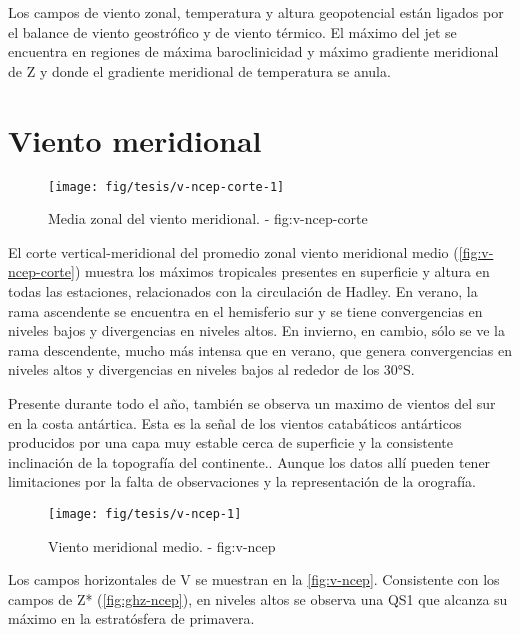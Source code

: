 \documentclass[spanish,a4paper,12p]{book}
\begin{document}
Los campos de viento zonal, temperatura y altura geopotencial están
ligados por el balance de viento geostrófico y de viento térmico. El
máximo del jet se encuentra en regiones de máxima baroclinicidad y
máximo gradiente meridional de Z y donde el gradiente meridional de
temperatura se anula.

\section{Viento meridional}\label{viento-meridional}

\begin{figure}

{\centering \texttt{[image: fig/tesis/v-ncep-corte-1]} 

}

\caption{Media zonal del viento meridional. - fig:v-ncep-corte}\label{fig:v-ncep-corte}
\end{figure}

El corte vertical-meridional del promedio zonal viento meridional medio
(\autoref{fig:v-ncep-corte}) muestra los máximos tropicales presentes en
superficie y altura en todas las estaciones, relacionados con la
circulación de Hadley. En verano, la rama ascendente se encuentra en el
hemisferio sur y se tiene convergencias en niveles bajos y divergencias
en niveles altos. En invierno, en cambio, sólo se ve la rama
descendente, mucho más intensa que en verano, que genera convergencias
en niveles altos y divergencias en niveles bajos al rededor de los 30°S.

Presente durante todo el año, también se observa un maximo de vientos
del sur en la costa antártica. Esta es la señal de los vientos
catabáticos antárticos producidos por una capa muy estable cerca de
superficie y la consistente inclinación de la topografía del
continente.. Aunque los datos allí pueden tener
limitaciones por la falta de observaciones y la representación de la
orografía.

\begin{landscape}\begin{figure}

{\centering \texttt{[image: fig/tesis/v-ncep-1]} 

}

\caption{Viento meridional medio. - fig:v-ncep}\label{fig:v-ncep}
\end{figure}
\end{landscape}

Los campos horizontales de V se muestran en la \autoref{fig:v-ncep}.
Consistente con los campos de Z* (\autoref{fig:ghz-ncep}), en niveles
altos se observa una QS1 que alcanza su máximo en la estratósfera de
primavera.
\end{document}
